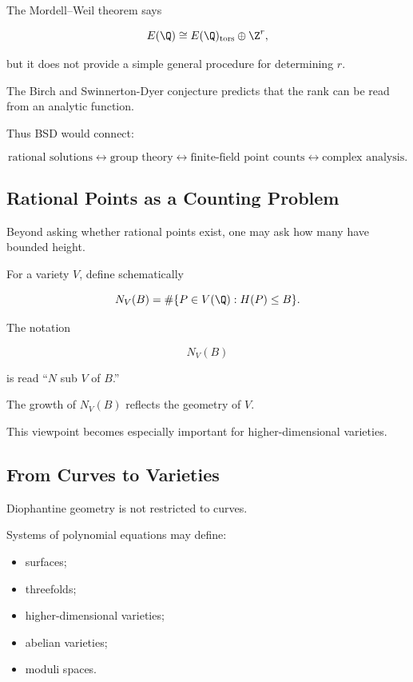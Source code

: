 The Mordell--Weil theorem says

\[ E(\Q)\cong E(\Q)_{\mathrm{tors}}\oplus\Z^r, \]

but it does not provide a simple general procedure for determining \(r\).

The Birch and Swinnerton-Dyer conjecture predicts that the rank can be read
from an analytic function.

Thus BSD would connect:

\[
\text{rational solutions}
\longleftrightarrow
\text{group theory}
\longleftrightarrow
\text{finite-field point counts}
\longleftrightarrow
\text{complex analysis}.
\]

\subsection{Rational Points as a Counting Problem}
\label{subsec:rational-points-counting}

Beyond asking whether rational points exist, one may ask how many have
bounded height.

For a variety \(V\), define schematically

\[ N_V(B)=\#\{P\in V(\Q):H(P)\leq B\}. \]

The notation

\[ N_V(B) \]

is read ``\(N\) sub \(V\) of \(B\).''

The growth of \(N_V(B)\) reflects the geometry of \(V\).

This viewpoint becomes especially important for higher-dimensional
varieties.

\subsection{From Curves to Varieties}
\label{subsec:curves-to-varieties}

Diophantine geometry is not restricted to curves.

Systems of polynomial equations may define:

\begin{itemize}
    \item surfaces;
    \item threefolds;
    \item higher-dimensional varieties;
    \item abelian varieties;
    \item moduli spaces.
\end{itemize}

